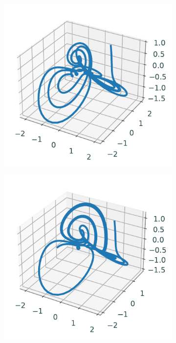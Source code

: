 \begin{figure}[H]
    \begin{subfigure}[b]{.3\textwidth}
        \centering
        \includegraphics[width = \textwidth]{figures/problem41.pdf}
    \end{subfigure}
    \begin{subfigure}[b]{.3\textwidth}
        \centering
        \includegraphics[width = \textwidth ]{figures/problem42.pdf}

\end{subfigure}
\end{figure}
